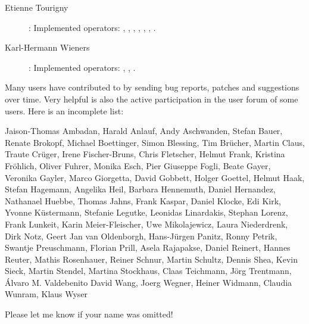 \begin{description}
\item[Etienne Tourigny]: Implemented operators:  {}, {},
 {}, {}, {}, {}, {}.

\item[Karl-Hermann Wieners]: Implemented operators: {},  {},  {}.
\end{description}







Many users have contributed to {\CDO} by sending bug reports, patches
and suggestions over time.
Very helpful is also the active participation in the user forum of some users.
Here is an incomplete list:

Jaison-Thomas Ambadan,
Harald Anlauf,
Andy Aschwanden,
Stefan Bauer,
Renate Brokopf,
Michael Boettinger,
Simon Blessing,
Tim Br\"ucher,
Martin Claus,
Traute Cr\"uger,
Irene Fischer-Bruns,
Chris Fletscher,
Helmut Frank,
Kristina Fr\"ohlich,
Oliver Fuhrer,
Monika Esch,
Pier Giuseppe Fogli,
Beate Gayer,
Veronika Gayler,
Marco Giorgetta,
David Gobbett,
Holger Goettel,
Helmut Haak,
Stefan Hagemann,
Angelika Heil,
Barbara Hennemuth,
Daniel Hernandez,
Nathanael Huebbe,
Thomas Jahns,
Frank Kaspar,
Daniel Klocke,
Edi Kirk,
Yvonne K\"ustermann,
Stefanie Legutke,
Leonidas Linardakis,
Stephan Lorenz,
Frank Lunkeit,
Karin Meier-Fleischer,
Uwe Mikolajewicz,
Laura Niederdrenk,
Dirk Notz,
Geert Jan van Oldenborgh,
Hans-J\"urgen Panitz,
Ronny Petrik,
Swantje Preuschmann,
Florian Prill,
Asela Rajapakse,
Daniel Reinert,
Hannes Reuter,
Mathis Rosenhauer,
Reiner Schnur,
Martin Schultz,
Dennis Shea,
Kevin Sieck,
Martin Stendel,
Martina Stockhaus,
Claas Teichmann,
J\"org Trentmann,
\'Alvaro M. Valdebenito
David Wang,
Joerg Wegner,
Heiner Widmann,
Claudia Wunram,
Klaus Wyser

Please let me know if your name was omitted!
